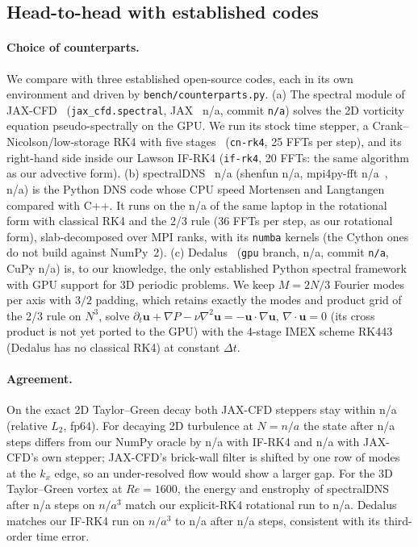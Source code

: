 \documentclass[11pt]{article}
\providecommand{\cpJaxVersion}{n/a}
\providecommand{\cpJaxCommit}{n/a}
\providecommand{\cpSdnsVersion}{n/a}
\providecommand{\cpShenfunVersion}{n/a}
\providecommand{\cpMpiFFTVersion}{n/a}
\providecommand{\cpMpiLib}{n/a}
\providecommand{\cpDedVersion}{n/a}
\providecommand{\cpDedCommit}{n/a}
\providecommand{\cpDedCupy}{n/a}
\providecommand{\cpCPU}{n/a}
\providecommand{\cpJaxTGErr}{n/a}
\providecommand{\cpVerTwoN}{n/a}
\providecommand{\cpVerTwoSteps}{n/a}
\providecommand{\cpJaxTurbErrIF}{n/a}
\providecommand{\cpJaxTurbErrCN}{n/a}
\providecommand{\cpSdnsErr}{n/a}
\providecommand{\cpSdnsVerN}{n/a}
\providecommand{\cpSdnsVerSteps}{n/a}
\providecommand{\cpDedErr}{n/a}
\providecommand{\cpDedVerN}{n/a}
\providecommand{\cpDedVerSteps}{n/a}
\begin{document}
\subsection{Head-to-head with established codes}\label{sec:h2h}

\paragraph{Choice of counterparts.} We compare with three established open-source codes, each in
its own environment and driven by \texttt{bench/counterparts.py}. (a) The spectral module of JAX-CFD~\cite{dresdner2022learning,
kochkov2021machine} (\texttt{jax\_cfd.spectral}, JAX~\cite{jax2018github} \cpJaxVersion{},
commit \texttt{\cpJaxCommit}) solves the 2D vorticity equation pseudo-spectrally on the GPU. We run its stock time stepper, a Crank--Nicolson/low-storage RK4 with five
stages~\cite{carpenter1994fourth} (\texttt{cn-rk4}, 25 FFTs per step), and its right-hand side
inside our Lawson IF-RK4 (\texttt{if-rk4}, 20 FFTs: the same algorithm as our advective form).
(b) spectralDNS~\cite{mortensen2016high} \cpSdnsVersion{} (shenfun \cpShenfunVersion,
mpi4py-fft \cpMpiFFTVersion~\cite{mortensen2018shenfun,mortensen2019mpi4py}, \cpMpiLib) is the
Python DNS code whose CPU speed Mortensen and Langtangen compared with C++. It runs on the
\cpCPU{} of the same laptop in the rotational form with classical RK4 and the 2/3 rule
(36 FFTs per step, as our rotational form), slab-decomposed over MPI ranks, with its
\texttt{numba} kernels (the Cython ones do not build against NumPy~2). (c) Dedalus~\cite{
burns2020dedalus} (\texttt{gpu} branch, \cpDedVersion, commit \texttt{\cpDedCommit}, CuPy
\cpDedCupy) is, to our knowledge, the only established Python spectral framework with GPU support
for 3D periodic problems. We keep $M=2N/3$ Fourier modes per axis with $3/2$ padding, which
retains exactly the modes and product grid of the 2/3 rule on $N^3$, solve
$\partial_t\mathbf u+\nabla P-\nu\nabla^2\mathbf u=-\mathbf u\cdot\nabla\mathbf u$,
$\nabla\cdot\mathbf u=0$ (its cross product is not yet ported to the GPU) with the 4-stage
IMEX scheme RK443 (Dedalus has no classical RK4) at constant $\Delta t$.


\paragraph{Agreement.} On the exact 2D Taylor--Green decay both JAX-CFD steppers stay within
\cpJaxTGErr{} (relative $L_2$, fp64). For decaying 2D turbulence at $N=\cpVerTwoN$ the state
after \cpVerTwoSteps{} steps differs from our NumPy oracle by \cpJaxTurbErrIF{} with IF-RK4 and
\cpJaxTurbErrCN{} with JAX-CFD's own stepper; JAX-CFD's brick-wall filter is shifted by one row
of modes at the $k_x$ edge, so an under-resolved flow would show a larger gap. For the 3D
Taylor--Green vortex at $Re=1600$, the energy and enstrophy of spectralDNS after
\cpSdnsVerSteps{} steps on $\cpSdnsVerN^3$ match our explicit-RK4 rotational run to
\cpSdnsErr{}. Dedalus matches our IF-RK4 run on $\cpDedVerN^3$ to \cpDedErr{} after
\cpDedVerSteps{} steps, consistent with its third-order time error.
\end{document}
